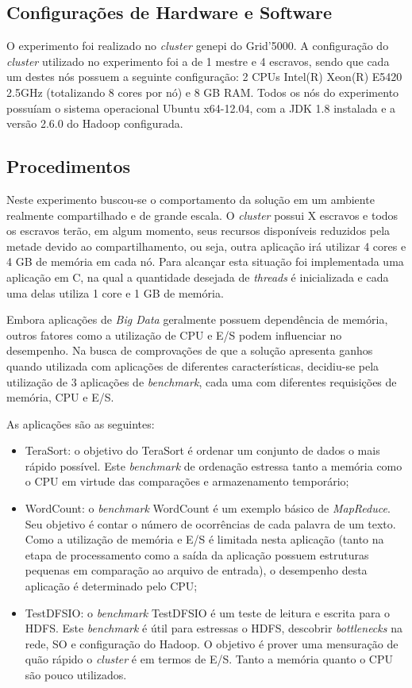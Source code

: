 \subsection{Configurações de Hardware e Software}
O experimento foi realizado no \textit{cluster} genepi do Grid'5000. A configuração do \textit{cluster} utilizado no experimento foi a de 1 mestre e 4 escravos, sendo que cada um destes nós possuem a seguinte configuração: 2 CPUs Intel(R) Xeon(R) E5420 2.5GHz (totalizando 8 cores por nó) e 8 GB RAM. Todos os nós do experimento possuíam o sistema operacional Ubuntu x64-12.04, com a JDK 1.8 instalada e a versão 2.6.0 do Hadoop configurada.

\subsection{Procedimentos}
Neste experimento buscou-se o comportamento da solução em um ambiente realmente compartilhado e de grande escala. O \textit{cluster} possui X escravos e todos os escravos terão, em algum momento, seus recursos disponíveis reduzidos pela metade devido ao compartilhamento, ou seja, outra aplicação irá utilizar 4 cores e 4 GB de memória em cada nó. Para alcançar esta situação foi implementada uma aplicação em C, na qual a quantidade desejada de \textit{threads} é inicializada e cada uma delas utiliza 1 core e 1 GB de memória.

Embora aplicações de \textit{Big Data} geralmente possuem dependência de memória, outros fatores como a utilização de CPU e E/S podem influenciar no desempenho. Na busca de comprovações de que a solução apresenta ganhos quando utilizada com aplicações de diferentes características, decidiu-se pela utilização de 3 aplicações de \textit{benchmark}, cada uma com diferentes requisições de memória, CPU e E/S.

As aplicações são as seguintes:
\begin{itemize}
	\item TeraSort: o objetivo do TeraSort \citep{TeraSort2008} é ordenar um conjunto de dados o mais rápido possível. Este \textit{benchmark} de ordenação estressa tanto a memória como o CPU em virtude das comparações e armazenamento temporário;
	\item WordCount: o \textit{benchmark} WordCount é um exemplo básico de \textit{MapReduce}. Seu objetivo é contar o número de ocorrências de cada palavra de um texto. Como a utilização de memória e E/S é limitada nesta aplicação (tanto na etapa de processamento como a saída da aplicação possuem estruturas pequenas em comparação ao arquivo de entrada), o desempenho desta aplicação é determinado pelo CPU;
	\item TestDFSIO: o \textit{benchmark} TestDFSIO é um teste de leitura e escrita para o HDFS. Este \textit{benchmark} é útil para estressas o HDFS, descobrir \textit{bottlenecks} na rede, SO e configuração do Hadoop. O objetivo é prover uma mensuração de quão rápido o \textit{cluster} é em termos de E/S. Tanto a memória quanto o CPU são pouco utilizados.
\end{itemize}

